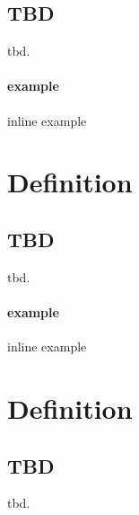 \documentclass{report}
\begin{document}
\subsection{TBD}

tbd.






\paragraph{example} inline example

\section{Definition}



\subsection{TBD}

tbd.






\paragraph{example} inline example

\section{Definition}



\subsection{TBD}

tbd.
\end{document}
